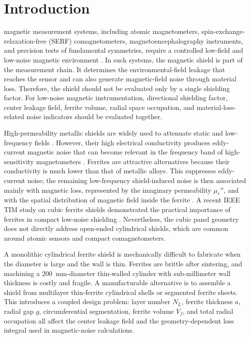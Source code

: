 \documentclass[letterpaper,journal]{IEEEtran}
\begin{document}
\section{Introduction}
 magnetic measurement systems, including atomic magnetometers, spin-exchange-relaxation-free (SERF) comagnetometers, magnetoencephalography instruments, and precision tests of fundamental symmetries, require a controlled low-field and low-noise magnetic environment \cite{ref1,ref2,ref3,ref4,ref5}. In such systems, the magnetic shield is part of the measurement chain. It determines the environmental-field leakage that reaches the sensor and can also generate magnetic-field noise through material loss. Therefore, the shield should not be evaluated only by a single shielding factor. For low-noise magnetic instrumentation, directional shielding factor, center leakage field, ferrite volume, radial space occupation, and material-loss-related noise indicators should be evaluated together.

High-permeability metallic shields are widely used to attenuate static and low-frequency fields \cite{ref6,ref7,ref8}. However, their high electrical conductivity produces eddy-current magnetic noise that can become relevant in the frequency band of high-sensitivity magnetometers \cite{ref9,ref10,ref11}. Ferrites are attractive alternatives because their conductivity is much lower than that of metallic alloys. This suppresses eddy-current noise; the remaining low-frequency shield-induced noise is then associated mainly with magnetic loss, represented by the imaginary permeability $\mu_r''$, and with the spatial distribution of magnetic field inside the ferrite \cite{ref9,ref12,ref13,ref14,ref15}. A recent IEEE TIM study on cubic ferrite shields demonstrated the practical importance of ferrites in compact low-noise shielding \cite{ref16}. Nevertheless, the cubic panel geometry does not directly address open-ended cylindrical shields, which are common around atomic sensors and compact comagnetometers.

A monolithic cylindrical ferrite shield is mechanically difficult to fabricate when the diameter is large and the wall is thin. Ferrites are brittle after sintering, and machining a \SI{200}{mm}-diameter thin-walled cylinder with sub-millimeter wall thickness is costly and fragile. A manufacturable alternative is to assemble a shield from multilayer thin-ferrite cylindrical shells or segmented ferrite sheets. This introduces a coupled design problem: layer number $N_L$, ferrite thickness $a$, radial gap $g$, circumferential segmentation, ferrite volume $V_f$, and total radial occupation all affect the center leakage field and the geometry-dependent loss integral used in magnetic-noise calculations.
\end{document}
